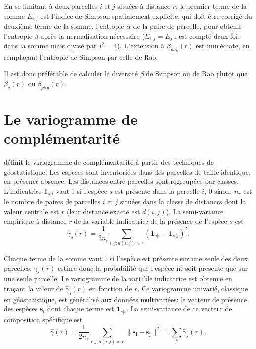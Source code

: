 \documentclass[
  11pt,
  french,
  a4paper,
  extrafontsizes,onecolumn,openright
  ]{memoir}
\begin{document}
En se limitant à deux parcelles \(i\) et \(j\) situées à distance \(r\), le premier terme de la somme \(E_{i,j}\) est l'indice de Simpson spatialement explicite, qui doit être corrigé du deuxième terme de la somme, l'entropie \(\alpha\) de la paire de parcelle, pour obtenir l'entropie \(\beta\) après la normalisation nécessaire (\(E_{i,j}=E_{j,i}\) est compté deux fois dans la somme mais divisé par \(I^2=4\)).
L'extension à \(\beta_{phy}(r)\) est immédiate, en remplaçant l'entropie de Simpson par celle de Rao.

Il est donc préférable de calculer la diversité \(\beta\) de Simpson ou de Rao plutôt que \(\beta_{s}(r)\) ou \(\beta_{phy}(r)\).

\hypertarget{le-variogramme-de-compluxe9mentarituxe9}{%
\section{Le variogramme de complémentarité}\label{le-variogramme-de-compluxe9mentarituxe9}}

\textcite{Wagner2003} définit le variogramme de complémentarité à partir des techniques de géostatistique.
Les espèces sont inventoriées dans des parcelles de taille identique, en présence-absence.
Les distances entre parcelles sont regroupées par classes.
L'indicatrice \({\mathbf 1}_{s|i}\) vaut 1 si l'espèce \(s\) est présente dans la parcelle \(i\), 0 sinon.
\(n_r\) est le nombre de paires de parcelles \(i\) et \(j\) situées dans la classe de distances dont la valeur centrale est \(r\) (leur distance exacte est \(d(i,j)\)).
La semi-variance empirique à distance \(r\) de la variable indicatrice de la présence de l'espèce \(s\) est
\begin{equation}
  \label{eq:Estgammasr}
  \hat{\gamma}_{s}(r) = \frac{1}{2 n_r} \sum_{i,j;d(i,j)\approx r}{({\mathbf 1}_{s|i} - {\mathbf 1}_{s|j})^2}.
\end{equation}

Chaque terme de la somme vaut 1 si l'espèce est présente sur une seule des deux parcelles: \(\hat{\gamma}_{s}(r)\) estime donc la probabilité que l'espèce ne soit présente que sur une seule parcelle.
Le variogramme de la variable indicatrice est obtenue en traçant la valeur de \(\hat{\gamma}_{s}(r)\) en fonction de \(r\).
Ce variogramme univarié, classique en géostatistique, est généralisé aux données multivariées: le vecteur de présence des espèces \(\mathbf{s_i}\) dont chaque terme est \({\mathbf 1}_{s|i}\).
La semi-variance de ce vecteur de composition spécifique est
\begin{equation}
  \label{eq:Estgammar}
  \hat{\gamma}(r) 
  = \frac{1}{2 n_r} \sum_{i,j;d(i,j)\approx r}{\| \mathbf{s_i}-\mathbf{s_j} \|^2}
  = \sum_{s}{\hat{\gamma}_{s}(r)}.
\end{equation}
\end{document}
